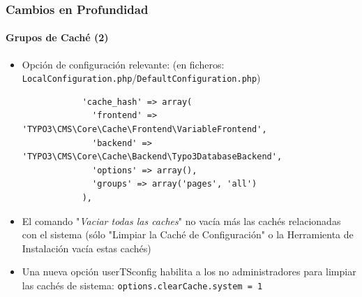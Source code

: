 \begin{frame}[fragile]
	\frametitle{Cambios en Profundidad}
	\framesubtitle{Grupos de Caché (2)}

	\lstset{
		basicstyle=\tiny\ttfamily
	}

	\begin{itemize}

		\item Opción de configuración relevante:\newline
			\smaller(en ficheros: \texttt{LocalConfiguration.php}/\texttt{DefaultConfiguration.php})\normalsize

			\begin{lstlisting}
			'cache_hash' => array(
			  'frontend' => 'TYPO3\CMS\Core\Cache\Frontend\VariableFrontend',
			  'backend' => 'TYPO3\CMS\Core\Cache\Backend\Typo3DatabaseBackend',
			  'options' => array(),
			  'groups' => array('pages', 'all')
			),
			\end{lstlisting}

		\item El comando "\textit{Vaciar todas las caches}" no vacía más las cachés relacionadas con el sistema
			(sólo "Limpiar la Caché de Configuración" o la Herramienta de Instalación vacía estas cachés)
		\item Una nueva opción userTSconfig habilita a los no administradores para limpiar las cachés de sistema:\newline
			\smaller\texttt{options.clearCache.system = 1}\normalsize

		\breakingchange

	\end{itemize}

\end{frame}


